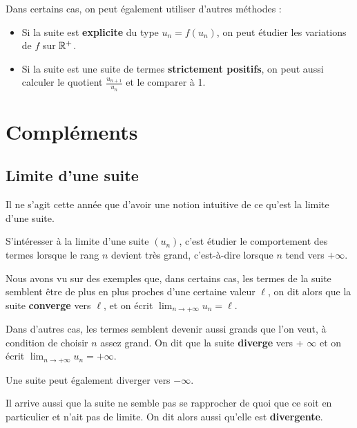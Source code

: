 \documentclass[a4paper,11pt]{article}
\begin{document}
\begin{crmq}[s]
Dans certains cas, on peut également utiliser d'autres méthodes :
\begin{itemize}
	\item Si la suite est \textbf{explicite} du type $u_n=f(u_n)$, on peut étudier les variations de $f$ sur $\R^{+}$.
	\item Si la suite est une suite de termes \textbf{strictement positifs}, on peut aussi calculer le quotient $\frac{u_{n+1}}{u_n}$ et le comparer à 1.
\end{itemize}
\end{crmq}

\section{Compléments}

\subsection{Limite d'une suite}

\begin{ccadre}
Il ne s'agit cette année que d'avoir une notion intuitive de ce qu'est la limite d'une suite.

\smallskip

S'intéresser à la limite d'une suite $(u_n)$, c'est étudier le comportement des termes lorsque le rang $n$ devient très grand, c'est-à-dire lorsque $n$ tend vers $+ \infty$.

\smallskip

Nous avons vu sur des exemples que, dans certains cas, les termes de la suite semblent être de plus en plus proches d'une certaine valeur $\ell$, on dit alors que la suite \textbf{converge} vers $\ell$, et on écrit  $\lim_{n\to +\infty}u_n=\ell$.

\smallskip

Dans d'autres cas, les termes semblent devenir aussi grands que l'on veut, à condition de choisir $n$ assez grand. On dit que la suite \textbf{diverge} vers + $\infty$ et on écrit $\lim_{n\to +\infty}u_n=+ \infty$.

Une suite peut également diverger vers $- \infty$.

\smallskip

Il arrive aussi que la suite ne semble pas se rapprocher de quoi que ce soit en particulier et n'ait pas de limite. On dit alors aussi qu'elle est \textbf{divergente}.
\end{ccadre}
\end{document}
